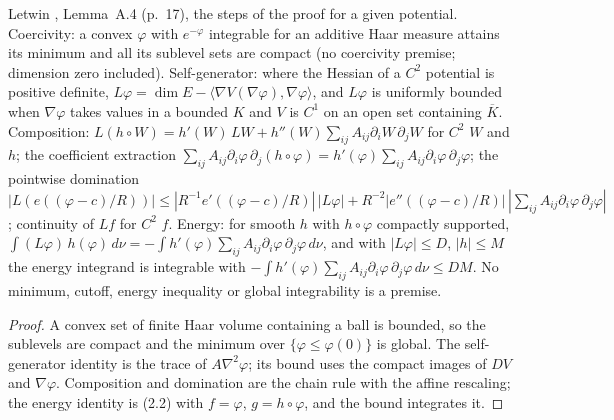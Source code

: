 \begin{lemma}
  \label{lem:letwin-a4-supports}
  \leanok
  Letwin \cite{Letwin2026QuadraticKLS}, Lemma~A.4 (p.~17), the steps of the proof for a given potential.  Coercivity: a
  convex $\varphi$ with $e^{-\varphi}$ integrable for an additive Haar measure attains its minimum and all its sublevel sets
  are compact (no coercivity premise; dimension zero included).  Self-generator: where the Hessian of a $C^2$ potential is
  positive definite, $L\varphi=\dim E-\langle\nabla V(\nabla\varphi),\nabla\varphi\rangle$, and $L\varphi$ is uniformly
  bounded when $\nabla\varphi$ takes values in a bounded $K$ and $V$ is $C^1$ on an open set containing $\overline K$.
  Composition: $L(h\circ W)=h'(W)\,LW+h''(W)\sum_{ij}A_{ij}\partial_iW\,\partial_jW$ for $C^2$ $W$ and $h$; the coefficient
  extraction $\sum_{ij}A_{ij}\partial_i\varphi\,\partial_j(h\circ\varphi)=h'(\varphi)\sum_{ij}A_{ij}\partial_i\varphi\,
  \partial_j\varphi$; the pointwise domination $|L(e((\varphi-c)/R))|\le|R^{-1}e'((\varphi-c)/R)|\,|L\varphi|
  +R^{-2}|e''((\varphi-c)/R)|\,|\sum_{ij}A_{ij}\partial_i\varphi\,\partial_j\varphi|$; continuity of $Lf$ for $C^2$ $f$.
  Energy: for smooth $h$ with $h\circ\varphi$ compactly supported, $\int(L\varphi)\,h(\varphi)\,d\nu=-\int h'(\varphi)
  \sum_{ij}A_{ij}\partial_i\varphi\,\partial_j\varphi\,d\nu$, and with $|L\varphi|\le D$, $|h|\le M$ the energy integrand
  is integrable with $-\int h'(\varphi)\sum_{ij}A_{ij}\partial_i\varphi\,\partial_j\varphi\,d\nu\le DM$.  No minimum,
  cutoff, energy inequality or global integrability is a premise.
\end{lemma}
\begin{proof}
  \leanok
  A convex set of finite Haar volume containing a ball is bounded, so the sublevels are compact and the minimum over
  $\{\varphi\le\varphi(0)\}$ is global.  The self-generator identity is the trace of $A\nabla^2\varphi$; its bound uses the
  compact images of $DV$ and $\nabla\varphi$.  Composition and domination are the chain rule with the affine rescaling;
  the energy identity is (2.2) with $f=\varphi$, $g=h\circ\varphi$, and the bound integrates it.
\end{proof}

